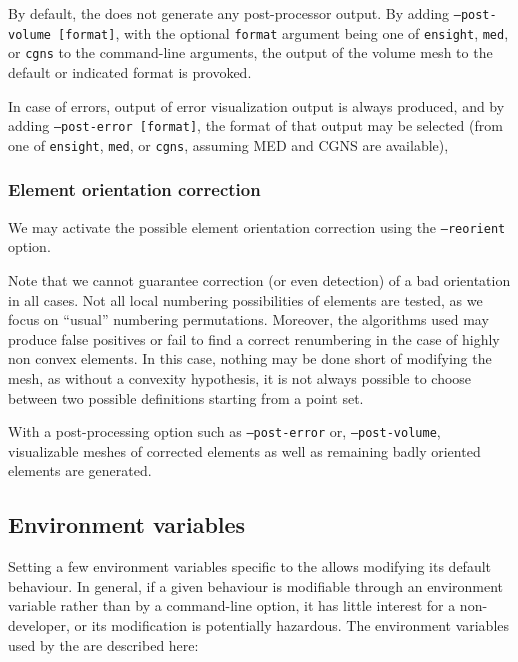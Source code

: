{{{By default, the \pcs does not generate any post-processor output.
By adding \texttt{--post-volume [format]},
with the optional \texttt{format} argument being one of \texttt{ensight},
\texttt{med}, or \texttt{cgns} to the command-line arguments,
the output of the volume mesh to the default or indicated format
is provoked.

In case of errors, output of error visualization output is always
produced, and by adding \texttt{--post-error [format]},
the format of that output may be selected (from one of \texttt{ensight},
\texttt{med}, or \texttt{cgns}, assuming MED and CGNS are
available),

\subsubsection{Element orientation correction\label{sec:optpcs:orient}}

We may activate the possible element orientation correction using the
\texttt{--reorient} option.

Note that we cannot guarantee correction (or even detection) of a bad
orientation in all cases.
Not all local numbering possibilities of elements are tested,
as we focus on ``usual'' numbering permutations. Moreover,
the algorithms used may produce false positives or fail to find
a correct renumbering in the case of highly non convex elements.
In this case, nothing may be done short of modifying the mesh, as
without a convexity hypothesis, it is not always possible to choose
between two possible definitions starting from a point set.

With a post-processing option such as \texttt{--post-error}
or, \texttt{--post-volume},
visualizable meshes of corrected elements as well as remaining
badly oriented elements are generated.

\subsection{Environment variables\label{sec:envvpcs}}

Setting a few environment variables specific to the \pcs allows modifying
its default behaviour. In general, if a given behaviour is modifiable
through an environment variable rather than by a command-line option,
it has little interest for a non-developer, or its modification is
potentially hazardous. The environment variables used by the \pcs
are described here:


}}}
